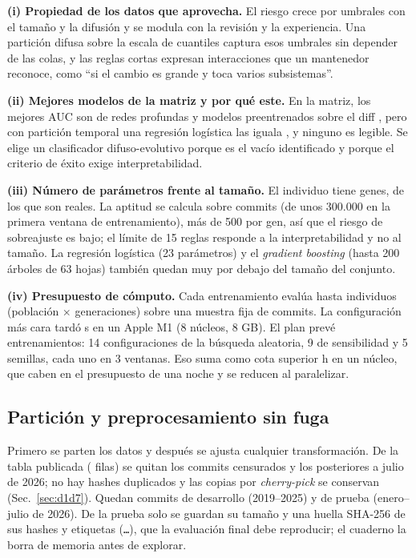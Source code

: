 \textbf{(i) Propiedad de los datos que aprovecha.} El riesgo crece por umbrales con el tamaño y la difusión y se modula con la revisión y la experiencia. Una partición difusa sobre la escala de cuantiles captura esos umbrales sin depender de las colas, y las reglas cortas expresan interacciones que un mantenedor reconoce, como ``si el cambio es grande y toca varios subsistemas''.

\textbf{(ii) Mejores modelos de la matriz y por qué este.} En la matriz, los mejores AUC son de redes profundas y modelos preentrenados sobre el diff \cite{Ni2022}, pero con partición temporal una regresión logística las iguala \cite{Zeng2021}, y ninguno es legible. Se elige un clasificador difuso-evolutivo porque es el vacío identificado y porque el criterio de éxito exige interpretabilidad.

\textbf{(iii) Número de parámetros frente al tamaño.} El individuo tiene \cifGenes{} genes, de los que \cifGenesReales{} son reales. La aptitud se calcula sobre \cifFilasAptitud{} commits (de unos 300.000 en la primera ventana de entrenamiento), más de 500 por gen, así que el riesgo de sobreajuste es bajo; el límite de 15 reglas responde a la interpretabilidad y no al tamaño. La regresión logística (23 parámetros) y el \emph{gradient boosting} (hasta 200 árboles de 63 hojas) también quedan muy por debajo del tamaño del conjunto.

\textbf{(iv) Presupuesto de cómputo.} Cada entrenamiento evalúa hasta \cifEvalAptitud{} individuos (población $\times$ generaciones) sobre una muestra fija de \cifFilasAptitud{} commits. La configuración más cara tardó \cifSegEntrenamiento{} s en un Apple M1 (8 núcleos, 8 GB). El plan prevé \cifNEntrenamientos{} entrenamientos: 14 configuraciones de la búsqueda aleatoria, 9 de sensibilidad y 5 semillas, cada uno en 3 ventanas. Eso suma como cota superior \cifHorasCota{} h en un núcleo, que caben en el presupuesto de una noche y se reducen al paralelizar.

\subsection{Partición y preprocesamiento sin fuga}
\label{sec:particion}
Primero se parten los datos y después se ajusta cualquier transformación. De la tabla publicada (\cifEtresFilas{} filas) se quitan los \cifEtresCensurados{} commits censurados y los \cifEtresPosteriores{} posteriores a julio de 2026; no hay hashes duplicados y las copias por \emph{cherry-pick} se conservan (Sec.~\ref{sec:d1d7}). Quedan \cifEtresDesarrollo{} commits de desarrollo (2019--2025) y \cifEtresPrueba{} de prueba (enero--julio de 2026). De la prueba solo se guardan su tamaño y una huella SHA-256 de sus hashes y etiquetas (\texttt{\cifEtresHuella\ldots}), que la evaluación final debe reproducir; el cuaderno la borra de memoria antes de explorar.

